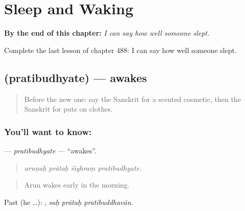 
\chapter{Sleep and Waking}
\label{ch:sa-sleep-and-waking}

\begin{chapteropening}
\textbf{By the end of this chapter:} \emph{I can say how well someone slept.}

Complete the last lesson of chapter 488: I can say how well someone slept.
\end{chapteropening}

\section[\texorpdfstring{\sk{प्रतिबुध्यते} (pratibudhyate)}{प्रतिबुध्यते (pratibudhyate)}]{ (pratibudhyate) — awakes}

\label{lesson:SA-C488-pratibudhyate}



\begin{quote}
Before the new one: say the Sanskrit for a scented cosmetic, then the Sanskrit for puts on clothes.
\end{quote}

\subsection*{You'll want to know: }
\textbf{} — \emph{pratibudhyate} — \textquotedblleft{}awakes\textquotedblright{}.

\begin{quote}
   
\end{quote}

\begin{quote}
\emph{aruṇaḥ prātaḥ śīghraṃ pratibudhyate.}
\end{quote}

\begin{quote}
Arun wakes early in the morning.
\end{quote}

Past (he …):   , \emph{saḥ prātaḥ pratibuddhavān}.

